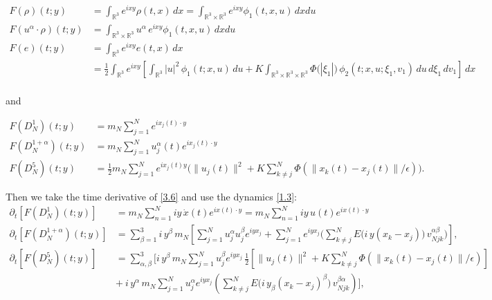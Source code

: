 \documentclass[11pt]{article}
\begin{document}
\begin{equation}
\begin{aligned}
F(\rho)(t;y)&=\int_{\mathbb{R}^3}e^{ixy}\rho(t,x)\,dx =\int_{\mathbb{R}^3\times\mathbb{R}^3}e^{ixy}\phi_1(t,x,u)\,dxdu\\
F(u^\alpha\cdot\rho)(t;y)& =\int_{\mathbb{R}^3\times\mathbb{R}^3}u^\alpha\,e^{ixy}\phi_1(t,x,u)\,dxdu\\
F(e)(t;y)&=\int_{\mathbb{R}^3}e^{ixy}e(t,x)\,dx\\& =\frac12\int_{\mathbb{R}^3}e^{ixy}[\int_{\mathbb{R}^3}|u|^2\,\phi_{1}(t;x,u)\,du
+K\int_{\mathbb{R}^3\times\mathbb{R}^3\times\mathbb{R}^3}\Phi\big(|\xi_1|\big)\,
\phi_{2}(t;x,u;\xi_1,v_1)\,du\,d\xi_1\,dv_1]\,dx\\
\end{aligned}
\label{3.5}\tag{3.5}
\end{equation}


and

\begin{equation}
\begin{aligned}
F(D^1_N)(t;y)&=m_N\sum_{j=1}^N e^{ix_j(t)\cdot y}\\
F(D^{1+\alpha}_N)(t;y)&=m_N\sum_{j=1}^N u_j^\alpha(t) e^{ix_j(t)\cdot y}\\ 
F(D^{5}_N)(t;y)&=\frac{1}{2}m_N\sum_{j=1}^N e^{ix_j(t)y}\Big(\|u_j(t)\|^2+K\sum_{k\neq j}^N\Phi(\|x_k(t)-x_j(t)\|/\epsilon)\Big).
\end{aligned}
\label{3.6}\tag{3.6}
\end{equation}

Then we take the time derivative of \eqref{3.6} and use the dynamics \eqref{1.3}:
\begin{equation}
\begin{aligned}
 \partial_t[F(D^1_N)(t;y)]&=m_N\sum_{n=1}^N iy\,\dot{x}(t)e^{ix(t)\cdot y}=m_N\sum_{n=1}^N iy\,u(t)e^{ix(t)\cdot y}\\[2pt]
\partial_t[F(D^{1+\alpha}_N)(t;y)] &=\sum_{\beta=1}^3i\,y^\beta\, m_N[\sum_{j=1}^Nu^\alpha_ju_j^\beta e^{iy x_j}+\sum_{j=1}^{N} e^{iyx_j}
 \Big( \sum_{k\neq j}^{N} E\big(i\,y(x_k-x_j)\big)\, v_{Njk}^{\alpha\beta}\Big)],\\[2pt]
\partial_t[F(D^{5}_N)(t;y)] &=\sum_{\alpha,\beta}^3 \Big[i\,y^\beta\, m_N\sum_{j=1}^{N}u_j^\beta e^{iyx_j}\,\frac{1}{2}[\|u_j(t)\|^2+K\sum_{k\neq j}^{N}\Phi(\|x_k(t)-x_j(t)\|/\epsilon)]
 \\& +\ i\,y^\alpha\, m_N\sum_{j=1}^{N}u_j^\alpha e^{iyx_j}
 ( \sum_{k\neq j}^{N} E\big(i\,y_\beta(x_k-x_j)^\beta\big)\, v_{Njk}^{\beta\alpha})\Big],
\end{aligned}
\label{3.7}\tag{3.7}
\end{equation}
\end{document}

